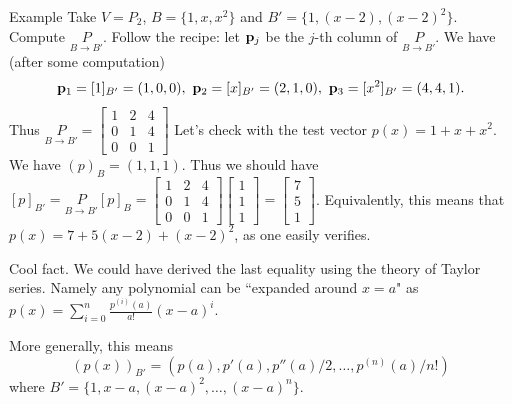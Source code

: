\begin{frame}{Example}
Take $V=P_2$, $B=\{1,x,x^2\}$ and $B'=\{1,(x-2), (x-2)^2\}$. Compute $\underset{B\rightarrow B'}{P}$. 
\bpause
Follow the recipe: let ${\mathbf p}_j$ be the $j$-th column of $\underset{B\rightarrow B'}{P}$. We have (after some computation)
\[
\boldp_1=[1]_{B'}=(1,0,0), \ \boldp_2=[x]_{B'}=(2,1,0), \ \boldp_3=[x^2]_{B'}=(4,4,1).
\]
Thus $\underset{B\rightarrow B'}{P}=\begin{bmatrix}1&2&4\\ 0&1&4\\ 0&0&1  \end{bmatrix}$
\bpause
Let's check with the test vector $p(x)=1+x+x^2$. We have $(p)_B=(1,1,1)$. Thus we should have 
$
[p]_{B'}=\underset{B\rightarrow B'}{P}[p]_B=\begin{bmatrix}1&2&4\\ 0&1&4\\ 0&0&1  \end{bmatrix}\begin{bmatrix}1 \\ 1 \\ 1\end{bmatrix}=\begin{bmatrix}
7\\ 5\\ 1
\end{bmatrix}$.
Equivalently, this means that $p(x)=7+5(x-2)+(x-2)^2$, as one easily verifies. 

\framebreak
\pause\alert{Cool fact}. We could have derived the last equality using the theory of Taylor series. Namely any polynomial can be ``expanded around $x=a$" as 
$
p(x)=\sum_{i=0}^n\frac{p^{(i)}(a)}{a!}(x-a)^i.
$

More generally, this means 
\[
(p(x))_{B'}=(p(a), p'(a), p''(a)/2, \dots , p^{(n)}(a)/n!)
\]
where $B'=\{1,x-a, (x-a)^2,\dots , (x-a)^n\}$. 
\end{frame}
